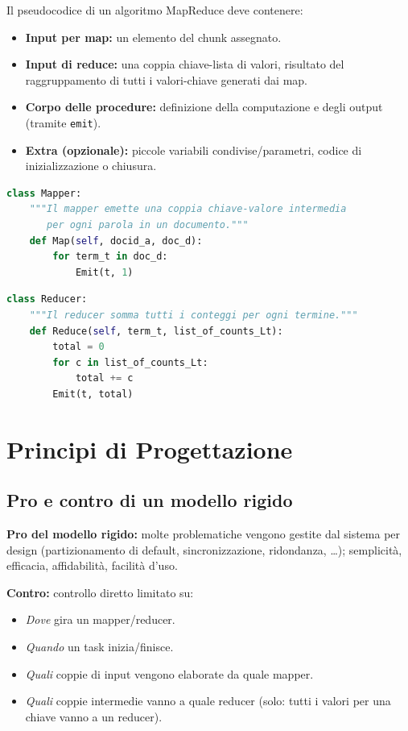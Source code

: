 Il pseudocodice di un algoritmo MapReduce deve contenere:
\begin{itemize}
  \item \textbf{Input per map:} un elemento del chunk assegnato.
  \item \textbf{Input di reduce:} una coppia chiave-lista di valori,
    risultato del raggruppamento di tutti i valori-chiave generati dai map.
  \item \textbf{Corpo delle procedure:} definizione della computazione
    e degli output (tramite \texttt{emit}).
  \item \textbf{Extra (opzionale):} piccole variabili condivise/parametri,
    codice di inizializzazione o chiusura.
\end{itemize}

\begin{lstlisting}[language=Python, caption={WordCount -- Mapper}]
class Mapper:
    """Il mapper emette una coppia chiave-valore intermedia
       per ogni parola in un documento."""
    def Map(self, docid_a, doc_d):
        for term_t in doc_d:
            Emit(t, 1)
\end{lstlisting}

\begin{lstlisting}[language=Python, caption={WordCount -- Reducer}]
class Reducer:
    """Il reducer somma tutti i conteggi per ogni termine."""
    def Reduce(self, term_t, list_of_counts_Lt):
        total = 0
        for c in list_of_counts_Lt:
            total += c
        Emit(t, total)
\end{lstlisting}

\newpage
\section{Principi di Progettazione}

\subsection{Pro e contro di un modello rigido}

\textbf{Pro del modello rigido:} molte problematiche vengono gestite dal
sistema per design (partizionamento di default, sincronizzazione, ridondanza,
\ldots); semplicità, efficacia, affidabilità, facilità d'uso.

\textbf{Contro:} controllo diretto limitato su:
\begin{itemize}
  \item \emph{Dove} gira un mapper/reducer.
  \item \emph{Quando} un task inizia/finisce.
  \item \emph{Quali} coppie di input vengono elaborate da quale mapper.
  \item \emph{Quali} coppie intermedie vanno a quale reducer (solo:
    tutti i valori per una chiave vanno a un reducer).
\end{itemize}

